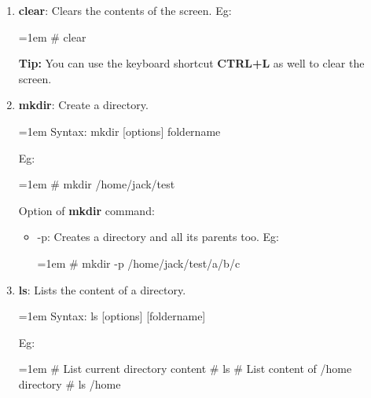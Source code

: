 \begin{flushleft}
\begin{enumerate}
		\item \textbf{clear}: Clears the contents of the screen.
		\newline	
		Eg:
		\begin{tcolorbox}[breakable,notitle,boxrule=-0pt,colback=black,colframe=black]
			\color{green}
			\font=1em
			\# clear
			\font=4pt
		\end{tcolorbox}
		\bigskip
		\begin{tcolorbox}[breakable,notitle,boxrule=-0pt,colback=orange,colframe=orange]
			\color{black}
			\textbf{Tip:} You can use the keyboard shortcut \textbf{CTRL+L} as well to clear the screen.
		\end{tcolorbox}
	
		\bigskip
		\bigskip
		
		\item \textbf{mkdir}: Create a directory.
		\bigskip
		\begin{tcolorbox}[breakable,notitle,boxrule=1pt,colback=pink,colframe=pink]
			\color{black}
			\font=1em
			Syntax:  mkdir [options] foldername
			\font=4pt
		\end{tcolorbox}
		Eg:
		\bigskip
		\begin{tcolorbox}[breakable,notitle,boxrule=-0pt,colback=black,colframe=black]
			\color{green}
			\font=1em
			\# mkdir /home/jack/test
			\font=4pt
		\end{tcolorbox}
		Option of \textbf{mkdir} command:
		\begin{itemize}
			\item -p: Creates a directory and all its parents too.
			\newline
			Eg:
			\begin{tcolorbox}[breakable,notitle,boxrule=-0pt,colback=black,colframe=black]
				\color{green}
				\font=1em
				\# mkdir -p /home/jack/test/a/b/c
				\font=4pt
			\end{tcolorbox}
		\end{itemize}
		\bigskip

		\item \textbf{ls}: Lists the content of a directory.
		\bigskip
		\begin{tcolorbox}[breakable,notitle,boxrule=1pt,colback=pink,colframe=pink]
			\color{black}
			\font=1em
			Syntax:  ls [options] [foldername]
			\font=4pt
		\end{tcolorbox}
	
		Eg:
		\bigskip
		\begin{tcolorbox}[breakable,notitle,boxrule=-0pt,colback=black,colframe=black]
			\font=1em
			\color{yellow}
            \# List current directory content
            \newline
            \color{green}
			\# ls        
			\newline
			\newline
			\color{yellow}
			\# List content of /home directory
			\newline
			\color{green}
			\# ls /home                
			\font=4pt
		\end{tcolorbox}
	

\end{enumerate}
\end{flushleft}
